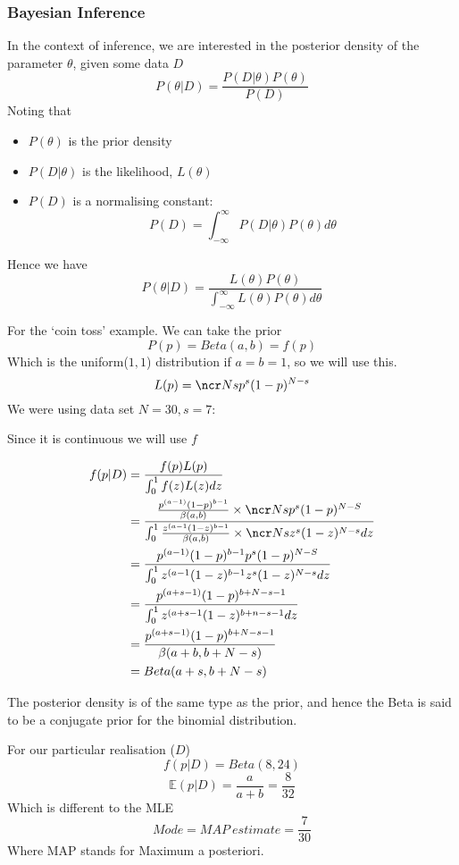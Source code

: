 \documentclass{X:/Documents/Coding/Latex/myassignment}
\begin{document}
\subsubsection{Bayesian Inference}
In the context of inference, we are interested in the posterior density of the parameter $\theta$, given some data $D$
\[P(\theta| D) = \frac{P(D|\theta)P(\theta)}{P(D)}\]
Noting that
\begin{itemize}
    \item $P(\theta)$ is the prior density
    \item $P(D|\theta)$ is the likelihood, $L(\theta)$
    \item $P(D)$ is a normalising constant:
    \[P(D) =\int_{-\infty}^\infty P(D | \theta) P(\theta) d\theta\]
\end{itemize}

Hence we have
\[P(\theta | D) = \frac{L(\theta) P(\theta)}{\int_{-\infty}^\infty L(\theta) P(\theta) d\theta}\]

For the `coin toss' example. We can take the prior 
\[P(p) = Beta(a,b) = f(p)\]
Which is the uniform($1,1$) distribution if $a=b=1$, so we will use this.
\[L(p) = \ncr Ns p^s(1-p)^{N-s}\]
We were using data set $N=30,s=7$:

Since it is continuous we will use $f$

\begin{align*}
    f(p|D) &= \frac{f(p)L(p)}{\int_0^1 f(z)L(z)dz}\\
    &=\frac{\frac{p^{(a-1)} (1-p)^{b-1}}{\beta(a,b)} \times \ncr Ns p^s (1-p)^{N-S}}{\int_0^1 \frac{z^{(a-1} (1-z)^{b-1}}{\beta(a,b)} \times \ncr Ns z^s (1-z)^{N-s} dz}\\
    &= \frac{p^{(a-1)} (1-p)^{b-1}p^s (1-p)^{N-S}}{\int_0^1 z^{(a-1} (1-z)^{b-1} z^s (1-z)^{N-s} dz}\\
    &= \frac{p^{(a+s-1)} (1-p)^{b+N-s-1}}{\int_0^1 z^{(a+s-1} (1-z)^{b+n-s-1}dz}\\
    &= \frac{p^{(a+s-1)} (1-p)^{b+N-s-1}}{\beta(a+b,b+N-s)}\\
    &= Beta(a+s,b+N-s)
\end{align*}

The posterior density is of the same type as the prior, and hence the Beta is said to be a conjugate prior for the binomial distribution.

For our particular realisation ($D$)
\[f(p|D) = Beta(8,24)\]
\[\mathbb{E}(p|D) = \frac{a}{a+b} =\frac{8}{32}\]
Which is different to the MLE
\[Mode = MAP \ estimate  = \frac{7}{30}\]
Where MAP stands for Maximum a posteriori.
\end{document}
